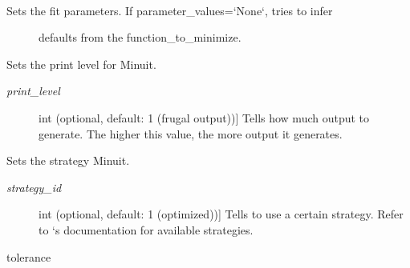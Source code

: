 \documentclass[a4paper,10pt,english]{sphinxmanual}
\begin{document}
\begin{fulllineitems}
\begin{fulllineitems}
\label{module_doc:kafe.minuit.Minuit.set_parameter_values}~\begin{description}
\item[{Sets the fit parameters. If parameter\_values={}`None{}`, tries to infer}] \leavevmode
defaults from the function\_to\_minimize.

\end{description}

\end{fulllineitems}


\begin{fulllineitems}
\label{module_doc:kafe.minuit.Minuit.set_print_level}
Sets the print level for Minuit.
\begin{description}
\item[{\emph{print\_level}}] \leavevmode{[}int (optional, default: 1 (frugal output)){]}
Tells  how much output to generate. The higher this
value, the more output it generates.

\end{description}

\end{fulllineitems}


\begin{fulllineitems}
\label{module_doc:kafe.minuit.Minuit.set_strategy}
Sets the strategy Minuit.
\begin{description}
\item[{\emph{strategy\_id}}] \leavevmode{[}int (optional, default: 1 (optimized)){]}
Tells  to use a certain strategy. Refer to `s
documentation for available strategies.

\end{description}

\end{fulllineitems}


\begin{fulllineitems}
\label{module_doc:kafe.minuit.Minuit.tolerance}
 tolerance


\end{fulllineitems}
\end{fulllineitems}
\end{document}
